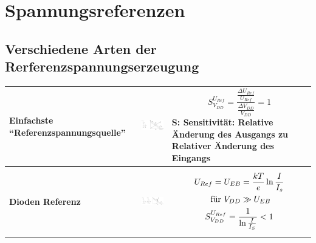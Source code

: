 \section{Spannungsreferenzen} 

\subsection{Verschiedene Arten der Rerferenzspannungserzeugung} 
	\begin{longtable}{|l|l|l|}
	\hline
		\begin{minipage}{4cm}
			\textbf{Einfachste "`Referenzspannungsquelle"'}
		\end{minipage}
	&
		\begin{minipage}{6cm}
			\includegraphics[width=6cm,trim=0 0 0 -5]{pictures/spannungsteiler}
		\end{minipage}
	&
		\begin{minipage}{8cm}
			\begin{equation*}
				S_{V_{DD}}^{U_{Ref}}=\frac{\frac{\Delta
				U_{Ref}}{U_{Ref}}}{\frac{\Delta V_{DD}}{V_{DD}}}=1
			\end{equation*}
			S: Sensitivität: Relative Änderung des Ausgangs zu Relativer Änderung des Eingangs
		\end{minipage}
	\\ \hline
		\begin{minipage}{4cm}
			\textbf{Dioden Referenz}
		\end{minipage}
	&
		\begin{minipage}{6cm}
			\includegraphics[width=6cm]{pictures/diodenReferenz}
		\end{minipage}
	&
		\begin{minipage}{8cm}
			\begin{gather*}
				U_{Ref}=U_{EB}=\frac{kT}{e}\ln{\frac{I}{I_{s}}} \notag\\
				\text{ für }V_{DD} \gg U_{EB}\\
				S_{V_{DD}}^{U_{Ref}}=\frac{1}{\ln{\frac{I}{I_{S}}}}<1

\end{gather*}
\end{minipage}
\end{longtable}
